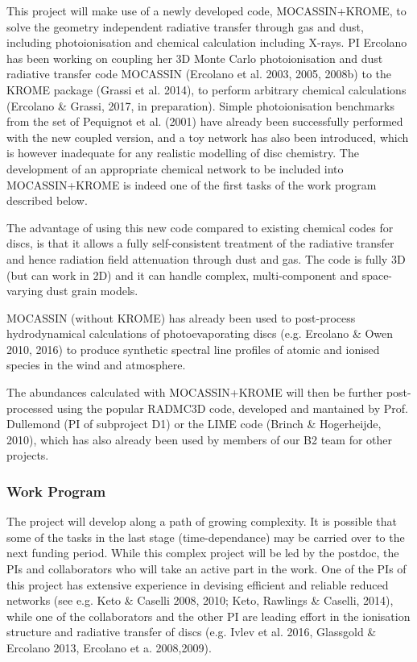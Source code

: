 \documentclass[10pt,fleqn,twoside]{article}
\begin{document}
This project will make use of a newly developed code, MOCASSIN+KROME, to solve the geometry independent radiative transfer through gas  and dust, including photoionisation and chemical calculation
  including X-rays. PI Ercolano has been working on coupling her 3D Monte Carlo photoionisation
and dust radiative transfer code MOCASSIN (Ercolano et al. 2003, 2005,
2008b) to the KROME package (Grassi et al. 2014), to perform arbitrary
chemical calculations (Ercolano \& Grassi, 2017, in
preparation). Simple photoionisation benchmarks from the set of
Pequignot et al. (2001) have already been successfully performed with
the new coupled version, and a toy network has also
been introduced, which is however inadequate for any realistic
modelling of disc chemistry. The development of an appropriate
chemical network to be included into MOCASSIN+KROME is indeed one of
the first tasks of the work program described below.

The advantage of using this new code compared to existing chemical
codes for discs, is that it allows a fully self-consistent treatment
of the radiative transfer and hence radiation field attenuation
through dust and gas. The code is fully 3D (but can work in 2D) and it
can handle complex, multi-component and space-varying dust grain models. 

MOCASSIN (without KROME) has already been used to post-process
hydrodynamical calculations of photoevaporating discs (e.g. Ercolano
\& Owen 2010, 2016) to produce synthetic spectral line profiles of
atomic and ionised species in the wind and atmosphere. 

The abundances calculated with MOCASSIN+KROME will then be further
post-processed using the popular RADMC3D code, developed and mantained
by Prof. Dullemond (PI of subproject D1) or the LIME code (Brinch \&
Hogerheijde, 2010), which has also already been used by members of our
B2 team for other projects. 


\subsubsection{Work Program}


The project will develop along a path of growing complexity. It is possible that some of the tasks in the last stage (time-dependance) may be carried over to the next funding period. While this complex project will be led by the postdoc, the PIs and collaborators who will take an active part in the work. One of the PIs of this project has extensive experience in devising efficient and reliable reduced networks (see e.g.  Keto \& Caselli 2008, 2010; Keto, Rawlings \& Caselli, 2014), while one of the collaborators and the other PI are leading effort in the ionisation structure and radiative transfer of discs (e.g. Ivlev et al. 2016, Glassgold \& Ercolano 2013, Ercolano et a. 2008,2009).  
\end{document}
